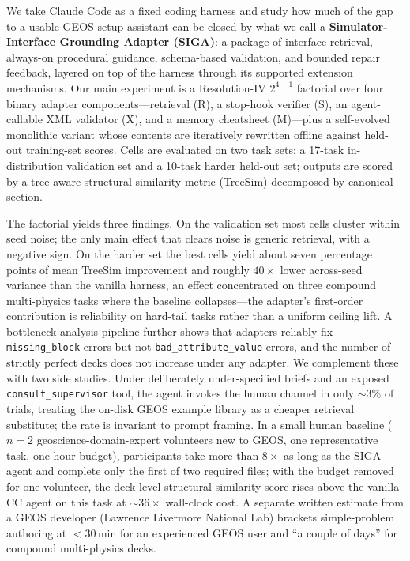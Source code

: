 \documentclass{article}
\begin{document}
We take Claude Code as a fixed coding harness and study how much of the gap to a usable GEOS setup assistant can be closed by what we call a \textbf{Simulator-Interface Grounding Adapter (SIGA)}: a package of interface retrieval, always-on procedural guidance, schema-based validation, and bounded repair feedback, layered on top of the harness through its supported extension mechanisms. Our main experiment is a Resolution-IV $2^{4-1}$ factorial over four binary adapter components---retrieval (R), a stop-hook verifier (S), an agent-callable XML validator (X), and a memory cheatsheet (M)---plus a self-evolved monolithic variant whose contents are iteratively rewritten offline against held-out training-set scores. Cells are evaluated on two task sets: a 17-task in-distribution validation set and a 10-task harder held-out set; outputs are scored by a tree-aware structural-similarity metric (TreeSim) decomposed by canonical section.

The factorial yields three findings. On the validation set most cells cluster within seed noise; the only main effect that clears noise is generic retrieval, with a negative sign. On the harder set the best cells yield about seven percentage points of mean TreeSim improvement and roughly $40\times$ lower across-seed variance than the vanilla harness, an effect concentrated on three compound multi-physics tasks where the baseline collapses---the adapter's first-order contribution is reliability on hard-tail tasks rather than a uniform ceiling lift. A bottleneck-analysis pipeline further shows that adapters reliably fix \texttt{missing\_block} errors but not \texttt{bad\_attribute\_value} errors, and the number of strictly perfect decks does not increase under any adapter. We complement these with two side studies. Under deliberately under-specified briefs and an exposed \texttt{consult\_supervisor} tool, the agent invokes the human channel in only ${\sim}3\%$ of trials, treating the on-disk GEOS example library as a cheaper retrieval substitute; the rate is invariant to prompt framing. In a small human baseline ($n{=}2$ geoscience-domain-expert volunteers new to GEOS, one representative task, one-hour budget), participants take more than $8\times$ as long as the SIGA agent and complete only the first of two required files; with the budget removed for one volunteer, the deck-level structural-similarity score rises above the vanilla-CC agent on this task at $\sim\!36\times$ wall-clock cost. A separate written estimate from a GEOS developer (Lawrence Livermore National Lab) brackets simple-problem authoring at ${<}30\,$min for an experienced GEOS user and ``a couple of days'' for compound multi-physics decks.
\end{document}
